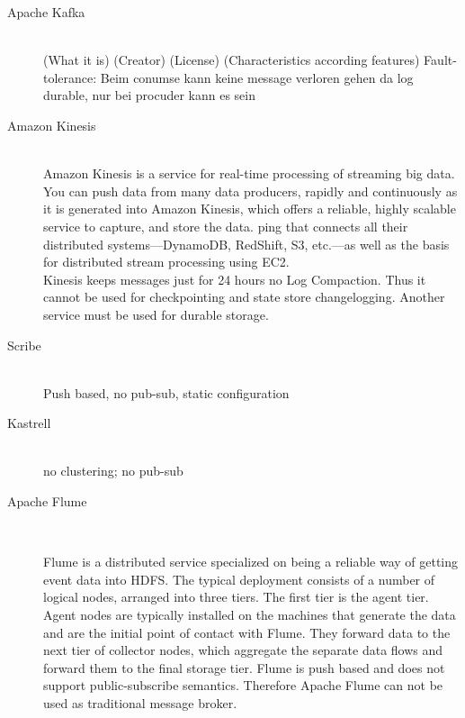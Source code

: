 \begin{description}
    \item [Apache Kafka] \hfill \\
        { (What it is) (Creator) (License) (Characteristics according features) Fault-tolerance: Beim conumse kann keine message verloren gehen da log durable, nur bei procuder kann es sein }
    \item [Amazon Kinesis] \hfill \\
    { Amazon Kinesis is a service for real-time processing of streaming big
    data. You can push data from many data producers, rapidly and continuously
as it is generated into Amazon Kinesis, which offers a reliable, highly
scalable service to capture, and store the data. ping that connects all their
distributed systems—DynamoDB, RedShift, S3, etc.—as well as the basis for
distributed stream processing using EC2. \\
 Kinesis keeps messages just for 24 hours no Log Compaction. Thus it cannot be
 used for checkpointing and state store changelogging. Another service must be
 used for durable storage.\\
    
 }
    \item [Scribe] \hfill \\
    { Push based, no pub-sub, static configuration}
    \item [Kastrell] \hfill \\
    {no clustering; no pub-sub}
    \item [Apache Flume] \hfill \\
    {Flume is a distributed service specialized on being a reliable way
    of getting event data into HDFS. The typical deployment consists of a number of
    logical nodes, arranged into three tiers. The first tier is the agent tier.
    Agent nodes are typically installed on the machines that generate the data and
    are the initial point of contact with Flume. They forward data to the
    next tier of collector nodes, which aggregate the separate data flows and
    forward them to the final storage tier. Flume is push based and does not support
    public-subscribe semantics. Therefore Apache Flume can not be used as
    traditional message broker. \cite{apacheflumeDoc}

}
\end{description}
